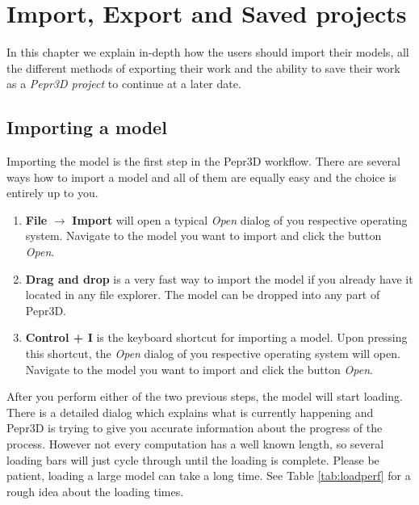 \chapter{Import, Export and Saved projects}

In this chapter we explain in-depth how the users should import their models, all the different methods of exporting their work and the ability to save their work as a \textit{Pepr3D project} to continue at a later date.

\section{Importing a model}

Importing the model is the first step in the Pepr3D workflow. There are several ways how to import a model and all of them are equally easy and the choice is entirely up to you.

\begin{enumerate}
\item \textbf{File} $\rightarrow$ \textbf{Import} will open a typical \textit{Open} dialog of you respective operating system. Navigate to the model you want to import and click the button \textit{Open}.

\item \textbf{Drag and drop} is a very fast way to import the model if you already have it located in any file explorer. The model can be dropped into any part of Pepr3D.

\item \textbf{Control + I} is the keyboard shortcut for importing a model. Upon pressing this shortcut, the \textit{Open} dialog of you respective operating system will open. Navigate to the model you want to import and click the button \textit{Open}.

\end{enumerate}

After you perform either of the two previous steps, the model will start loading. There is a detailed dialog which explains what is currently happening and Pepr3D is trying to give you accurate information about the progress of the process. However not every computation has a well known length, so several loading bars will just cycle through until the loading is complete. Please be patient, loading a large model can take a long time. See Table \ref{tab:loadperf} for a rough idea about the loading times.

